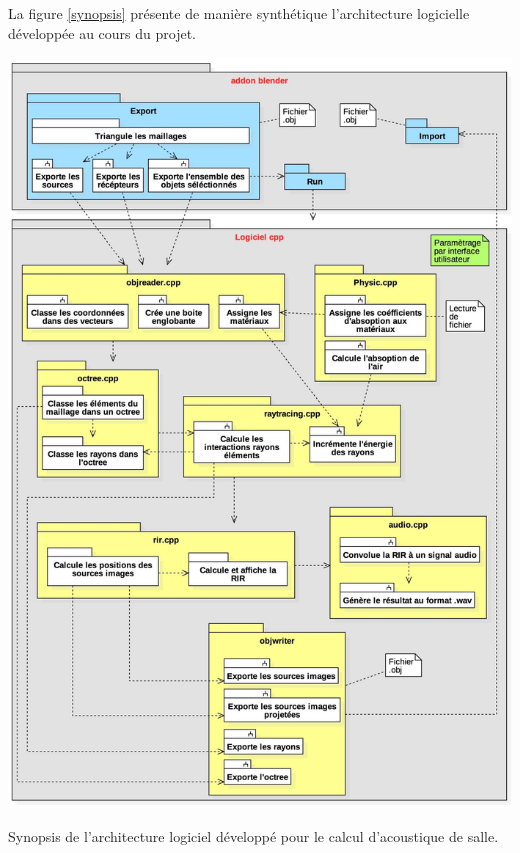 La figure \ref{synopsis} présente de manière synthétique l'architecture logicielle développée au cours du projet. 
%
\begin{figureth}
	\includegraphics[width=\linewidth]{images/synopsis}
	\caption{Synopsis de l'architecture logiciel développé pour le calcul d'acoustique de salle.}
	\label{synopsis}
\end{figureth}


